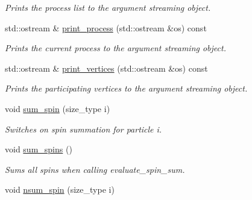 \begin{DoxyCompactItemize}
\begin{DoxyCompactList}\small\item\em Prints the process list to the argument streaming object. \end{DoxyCompactList}\item 
\hypertarget{a00065_adee5560e371f72c271fca2297ec856b9}{}std\+::ostream \& \hyperlink{a00065_adee5560e371f72c271fca2297ec856b9}{print\+\_\+process} (std\+::ostream \&os) const \label{a00065_adee5560e371f72c271fca2297ec856b9}

\begin{DoxyCompactList}\small\item\em Prints the current process to the argument streaming object. \end{DoxyCompactList}\item 
\hypertarget{a00065_ad6c31ec843cc98a64213f0ec470c9326}{}std\+::ostream \& \hyperlink{a00065_ad6c31ec843cc98a64213f0ec470c9326}{print\+\_\+vertices} (std\+::ostream \&os) const \label{a00065_ad6c31ec843cc98a64213f0ec470c9326}

\begin{DoxyCompactList}\small\item\em Prints the participating vertices to the argument streaming object. \end{DoxyCompactList}\item 
\hypertarget{a00065_acb71ec573b3a5d47ceeb3355e99ce33f}{}void \hyperlink{a00065_acb71ec573b3a5d47ceeb3355e99ce33f}{sum\+\_\+spin} (size\+\_\+type i)\label{a00065_acb71ec573b3a5d47ceeb3355e99ce33f}

\begin{DoxyCompactList}\small\item\em Switches on spin summation for particle i. \end{DoxyCompactList}\item 
\hypertarget{a00065_afb83877c21aafd2895eea5c4a058f132}{}void \hyperlink{a00065_afb83877c21aafd2895eea5c4a058f132}{sum\+\_\+spins} ()\label{a00065_afb83877c21aafd2895eea5c4a058f132}

\begin{DoxyCompactList}\small\item\em Sums all spins when calling evaluate\+\_\+spin\+\_\+sum. \end{DoxyCompactList}\item 
\hypertarget{a00065_a95abb5d5bafbe2d8b2c96e8c01efd6c9}{}void \hyperlink{a00065_a95abb5d5bafbe2d8b2c96e8c01efd6c9}{nsum\+\_\+spin} (size\+\_\+type i)\label{a00065_a95abb5d5bafbe2d8b2c96e8c01efd6c9}


\end{DoxyCompactItemize}
